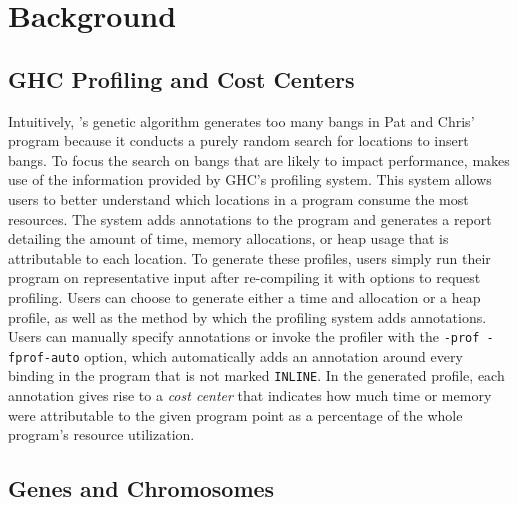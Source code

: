 \chapter{Background} 

\label{Chapter2} %


\section{GHC Profiling and Cost Centers}

Intuitively, \Ao{}'s genetic algorithm generates too many bangs in Pat
and Chris' program
because it conducts a purely random search for locations to insert bangs.
To focus the search on bangs that are likely to impact performance, \At{} makes use of the information provided by GHC's profiling system.
This system allows users to better understand which locations
in a program consume the most resources. The system adds annotations
to the program and generates a report detailing the amount of time,
memory allocations, or heap usage that is attributable to each location.
To generate these profiles, users simply run their program on
representative input after re-compiling it with options to request profiling.
Users can choose to generate either a time and allocation or a heap
profile, as well as the method by which the profiling system adds
annotations. Users can manually specify
annotations or invoke the profiler with  the \texttt{-prof -fprof-auto} option, which
automatically adds an annotation around every binding in the program
that is not marked \texttt{INLINE}. In the generated profile, each
annotation gives rise to a \textit{cost center} that indicates how
much time or memory were attributable to the given program point as a
percentage of the whole program's resource utilization.


\section{Genes and Chromosomes}

